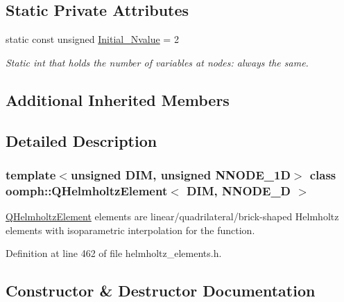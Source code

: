 \subsection*{Static Private Attributes}
\begin{DoxyCompactItemize}
\item 
static const unsigned \hyperlink{classoomph_1_1QHelmholtzElement_a37a84fca1e6a286a866ba74689998a17}{Initial\+\_\+\+Nvalue} = 2
\begin{DoxyCompactList}\small\item\em Static int that holds the number of variables at nodes\+: always the same. \end{DoxyCompactList}\end{DoxyCompactItemize}
\subsection*{Additional Inherited Members}


\subsection{Detailed Description}
\subsubsection*{template$<$unsigned D\+IM, unsigned N\+N\+O\+D\+E\+\_\+1D$>$\newline
class oomph\+::\+Q\+Helmholtz\+Element$<$ D\+I\+M, N\+N\+O\+D\+E\+\_\+D $>$}

\hyperlink{classoomph_1_1QHelmholtzElement}{Q\+Helmholtz\+Element} elements are linear/quadrilateral/brick-\/shaped Helmholtz elements with isoparametric interpolation for the function. 

Definition at line 462 of file helmholtz\+\_\+elements.\+h.



\subsection{Constructor \& Destructor Documentation}
\mbox{\label{classoomph_1_1QHelmholtzElement_a94fe2070858865e831825c4a0ca4c501}} 
